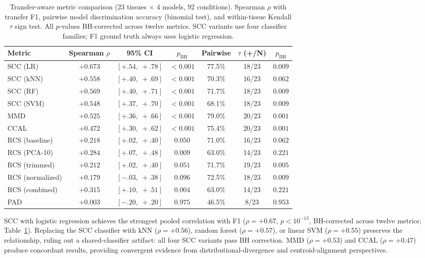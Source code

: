 \documentclass[11pt]{article}
\begin{document}
\medskip
\begin{table}[t]
\centering
\caption{Transfer-aware metric comparison (23 tissues $\times$ 4
models, 92 conditions). Spearman $\rho$ with transfer F1, pairwise
model discrimination accuracy (binomial test), and within-tissue
Kendall $\tau$ sign test. All $p$-values BH-corrected across twelve
metrics. SCC variants use four classifier families; F1 ground truth
always uses logistic regression.}
\label{tab:scc}
\small
\begin{tabular}{@{}lcccccc@{}}
\toprule
Metric & Spearman $\rho$ & 95\% CI & $p_{\text{BH}}$ & Pairwise & $\tau$ (+/N) & $p_{\text{BH}}$ \\
\midrule
SCC (LR)         & $+0.673$ & $[+.54,\;+.78]$ & $<0.001$ & 77.5\% & 18/23 & $0.009$ \\
SCC (kNN)        & $+0.558$ & $[+.40,\;+.69]$ & $<0.001$ & 70.3\% & 16/23 & $0.062$ \\
SCC (RF)         & $+0.569$ & $[+.40,\;+.71]$ & $<0.001$ & 71.7\% & 18/23 & $0.009$ \\
SCC (SVM)        & $+0.548$ & $[+.37,\;+.70]$ & $<0.001$ & 68.1\% & 18/23 & $0.009$ \\
\midrule
MMD              & $+0.525$ & $[+.36,\;+.66]$ & $<0.001$ & 79.0\% & 20/23 & $0.001$ \\
CCAL             & $+0.472$ & $[+.30,\;+.62]$ & $<0.001$ & 75.4\% & 20/23 & $0.001$ \\
\midrule
RCS (baseline)   & $+0.218$ & $[+.02,\;+.40]$ & $0.050$  & 71.0\% & 16/23 & $0.062$ \\
RCS (PCA-10)     & $+0.284$ & $[+.07,\;+.48]$ & $0.009$  & 63.0\% & 14/23 & $0.221$ \\
RCS (trimmed)    & $+0.212$ & $[+.02,\;+.40]$ & $0.051$  & 71.7\% & 19/23 & $0.005$ \\
RCS (normalized) & $+0.179$ & $[-.03,\;+.38]$ & $0.096$  & 72.5\% & 18/23 & $0.009$ \\
RCS (combined)   & $+0.315$ & $[+.10,\;+.51]$ & $0.004$  & 63.0\% & 14/23 & $0.221$ \\
\midrule
PAD              & $+0.003$ & $[-.20,\;+.20]$ & $0.975$  & 46.5\% &  8/23 & $0.953$ \\
\bottomrule
\end{tabular}
\end{table}

SCC with logistic regression achieves the strongest pooled correlation
with F1 ($\rho = +0.67$, $p < 10^{-13}$, BH-corrected across twelve
metrics; Table~\ref{tab:scc}). Replacing the SCC classifier with
kNN ($\rho = +0.56$), random forest ($\rho = +0.57$), or linear SVM
($\rho = +0.55$) preserves the relationship, ruling out a shared-classifier
artifact: all four SCC variants pass BH correction.
MMD ($\rho = +0.53$) and CCAL ($\rho = +0.47$) produce concordant
results, providing convergent evidence from distributional-divergence
and centroid-alignment perspectives.
\end{document}
